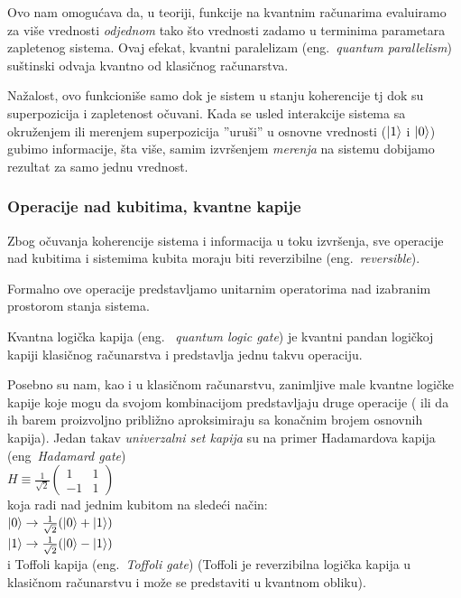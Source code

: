 \documentclass[a4paper]{article}
\begin{document}
{Ovo nam omogućava da, u teoriji, funkcije na kvantnim računarima evaluiramo za više vrednosti \emph{odjednom} tako što vrednosti zadamo u terminima parametara zapletenog sistema. Ovaj efekat, kvantni paralelizam (eng.~\emph{quantum parallelism}) \cite[Ch. 1.4.2]{knjiga} suštinski odvaja kvantno od klasičnog računarstva.

Nažalost, ovo funkcioniše samo dok je sistem u stanju koherencije  tj dok su superpozicija i zapletenost očuvani. Kada se usled interakcije sistema sa okruženjem ili merenjem superpozicija ''uruši'' u osnovne vrednosti ($\ket{1}$ i $\ket{0}$) gubimo informacije, šta više, samim izvršenjem \emph{merenja} na sistemu dobijamo rezultat za samo jednu vrednost.\cite[Ch. 1.4.2]{knjiga}

\subsubsection {Operacije nad kubitima, kvantne kapije}

Zbog očuvanja koherencije sistema i informacija u toku izvršenja, sve operacije nad kubitima i sistemima kubita moraju biti reverzibilne (eng.~\emph{reversible}).

Formalno ove operacije predstavljamo unitarnim operatorima nad izabranim prostorom stanja sistema.

Kvantna logička kapija (eng. ~\emph{quantum logic gate}) je kvantni pandan logičkoj kapiji klasičnog računarstva i predstavlja jednu takvu operaciju.

Posebno su nam, kao i u klasičnom računarstvu, zanimljive male kvantne logičke kapije koje mogu da svojom kombinacijom predstavljaju druge operacije ( ili da ih barem proizvoljno približno aproksimiraju sa konačnim brojem osnovnih kapija). Jedan takav \emph{univerzalni set kapija} su na primer Hadamardova kapija (eng~\emph{Hadamard gate})\\
\smallskip
$H\equiv\frac{1}{\sqrt{2}}\begin{pmatrix}
1&1\\
-1&1
\end{pmatrix}$ \cite[Ch. 1.3.1]{knjiga}\\
\smallskip
koja radi nad jednim kubitom na sledeći način:\\
\smallskip
$\ket{0} \rightarrow \frac{1}{\sqrt{2}}(\ket{0} + \ket{1})$\\
\smallskip
$\ket{1} \rightarrow \frac{1}{\sqrt{2}}(\ket{0} - \ket{1})$\\

i Toffoli kapija (eng.~\emph{Toffoli gate}) (Toffoli je reverzibilna logička kapija u klasičnom računarstvu i može se predstaviti u kvantnom obliku).

}
\end{document}
